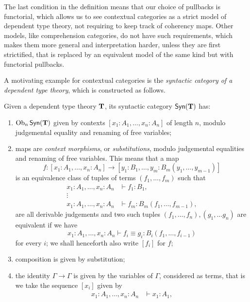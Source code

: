 \begin{rmk}
  The last condition in the definition means that our choice of pullbacks is
  functorial, which allows us to see contextual categories as a strict model of
  dependent type theory, not requiring to keep track of coherency maps.
  Other models, like comprehension categories, do not
  have such requirements, which makes them more general and
  interpretation harder, unless they are first strictified, that is replaced by
  an equivalent model of the same kind but with functorial pullbacks.
\end{rmk}

\noindent
A motivating example for contextual categories is the \emph{syntactic category
of a dependent type theory}, which is constructed as follows.

\begin{construction}\cite[2.6]{Car78}
  Given a dependent type theory $\operatorname{\mathbf{T}}$, its syntactic category $\mathsf{Syn}(\mathbf{\operatorname{\mathbf{T}}})$ has:
  \begin{enumerate}
    \item $\operatorname{Ob}_n\mathsf{Syn}(\mathbf{\operatorname{\mathbf{T}}})$ given by contexts $[x_1:A_1,\ldots,x_n:A_n]$ of length
      $n$, modulo judgemental equality and renaming of free variables;
    \item maps are \emph{context morphisms}, or \emph{substitutions}, modulo
      judgemental equalities and renaming of free variables. This means that a
      map
      \[f\colon[x_1:A_1,\ldots,x_n:A_n]\rightarrow[y_1:B_1,\ldots,y_m:B_m(y_1,\ldots,y_{m-1})]\]
      is an equivalence class of tuples of terms $(f_1,\ldots,f_m)$ such that
      \begin{align*}
        x_1:A_1,\ldots,x_n:A_n &\vdash f_1:B_1, \\
        \vdots & \\
        x_1:A_1,\ldots,x_n:A_n &\vdash f_m:B_m(f_1,\ldots,f_{m-1}),
      \end{align*}
      are all derivable judgements and two such tuples
      $(f_1,\ldots,f_n),(g_1,\ldots g_n)$ are equivalent if we have
      \[x_1:A_1,\ldots,x_n:A_n\vdash f_i\equiv g_i:B_i(f_1,\ldots,f_{i-1})\]
      for every $i$; we shall henceforth also write $[f_i]$ for $f$;
    \item composition is given by substitution;
    \item the identity $\Gamma\rightarrow\Gamma$ is given by the variables of
      $\Gamma$, considered as
      terms, that is we take the sequence $[x_i]$ given by
      \begin{align*}
        x_1:A_1,\ldots,x_n:A_n &\vdash x_1:A_1, \\

\end{align*}
\end{enumerate}
\end{construction}
